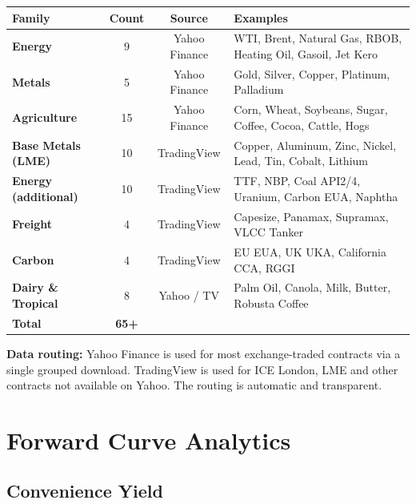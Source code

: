 \documentclass[11pt,a4paper]{article}
\newenvironment{notebox}{%
  \begin{tcolorbox}[
    colback=notebg, colframe=noteborder,
    left=8pt, right=8pt, top=5pt, bottom=5pt, boxrule=0.5pt
  ]
}{\end{tcolorbox}}
\begin{document}
\begin{center}
\begin{tabularx}{\textwidth}{>{\bfseries}l c c X}
\toprule
Family & Count & Source & Examples \\
\midrule
Energy              & 9  & Yahoo Finance  & WTI, Brent, Natural Gas, RBOB, Heating Oil, Gasoil, Jet Kero \\
Metals              & 5  & Yahoo Finance  & Gold, Silver, Copper, Platinum, Palladium \\
Agriculture         & 15 & Yahoo Finance  & Corn, Wheat, Soybeans, Sugar, Coffee, Cocoa, Cattle, Hogs \\
Base Metals (LME)   & 10 & TradingView    & Copper, Aluminum, Zinc, Nickel, Lead, Tin, Cobalt, Lithium \\
Energy (additional) & 10 & TradingView    & TTF, NBP, Coal API2/4, Uranium, Carbon EUA, Naphtha \\
Freight             & 4  & TradingView    & Capesize, Panamax, Supramax, VLCC Tanker \\
Carbon              & 4  & TradingView    & EU EUA, UK UKA, California CCA, RGGI \\
Dairy \& Tropical   & 8  & Yahoo / TV     & Palm Oil, Canola, Milk, Butter, Robusta Coffee \\
\midrule
\textbf{Total}      & \textbf{65+} & & \\
\bottomrule
\end{tabularx}
\end{center}

\begin{notebox}
\textbf{Data routing:} Yahoo Finance is used for most exchange-traded contracts via a single grouped download. TradingView is used for ICE London, LME and other contracts not available on Yahoo. The routing is automatic and transparent.
\end{notebox}

\section{Forward Curve Analytics}

\subsection{Convenience Yield}
\end{document}
